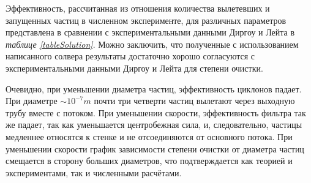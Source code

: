 Эффективность, рассчитанная из отношения количества вылетевших и запущенных частиц в численном эксперименте, для различных параметров представлена в сравнении с экспериментальными данными Диргоу и Лейта \cite{DirgoLeith} в \textit{таблице \ref{tableSolution}}.
Можно заключить, что полученные с использованием написанного солвера результаты достаточно хорошо согласуются с экспериментальными данными Диргоу и Лейта для степени очистки.

Очевидно, при уменьшении диаметра частиц, эффективность циклонов падает. При диаметре $ \sim 10^{-7}m$ почти три четверти частиц вылетают через выходную трубу вместе с потоком. При уменьшении скорости, эффективность фильтра так же падает, так как уменьшается центробежная сила, и, следовательно, частицы медленнее относятся к стенке и не отсоединяются от основного потока. При уменьшении скорости график зависимости степени очистки от диаметра частиц смещается в сторону больших диаметров, что подтверждается как теорией и экспериментами, так и численными расчётами.

